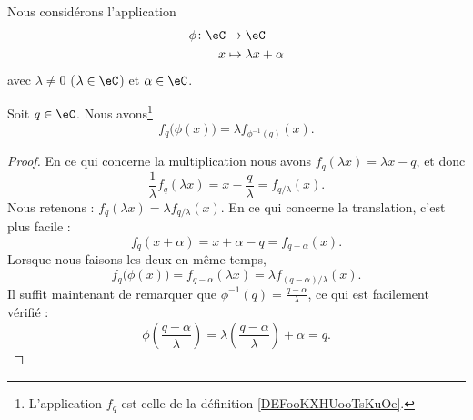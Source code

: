 \begin{lemma}		\label{LEMooSULYooWiEoyf}
	Nous considérons l'application
	\begin{equation}
		\begin{aligned}
			\phi\colon  \eC & \to \eC                  \\
			x               & \mapsto \lambda x+\alpha
		\end{aligned}
	\end{equation}
	avec \( \lambda\neq 0\) (\( \lambda\in \eC\)) et \( \alpha\in \eC\).

	Soit \( q\in \eC\). Nous avons\footnote{L'application \( f_q\) est celle de la définition \ref{DEFooKXHUooTsKuOe}.}
	\begin{equation}
		f_q\big( \phi(x) \big)=\lambda f_{\phi^{-1}(q)}(x).
	\end{equation}
\end{lemma}

\begin{proof}
	En ce qui concerne la multiplication nous avons $f_q(\lambda x)=\lambda x-q$, et donc
	\begin{equation}
		\frac{1}{ \lambda}f_q(\lambda x)=x-\frac{ q }{ \lambda }=f_{q/\lambda}(x).
	\end{equation}
	Nous retenons : \( f_q(\lambda x)=\lambda f_{q/\lambda}(x)\). En ce qui concerne la translation, c'est plus facile :
	\begin{equation}
		f_q(x+\alpha)=x+\alpha-q=f_{q-\alpha}(x).
	\end{equation}
	Lorsque nous faisons les deux en même temps,
	\begin{equation}
		f_q\big( \phi(x) \big)=f_{q-\alpha}(\lambda x)=\lambda f_{(q-\alpha)/\lambda}(x).
	\end{equation}
	Il suffit maintenant de remarquer que \( \phi^{-1}(q)=\frac{ q-\alpha }{ \lambda }\), ce qui est facilement vérifié :
	\begin{equation}
		\phi\left( \frac{ q-\alpha }{ \lambda } \right)=\lambda\left( \frac{ q-\alpha }{ \lambda } \right)+\alpha=q.
	\end{equation}
\end{proof}

